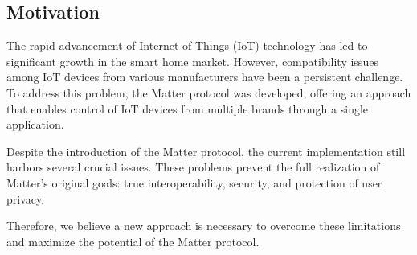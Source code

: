 \documentclass[conference]{IEEEtran}
\begin{document}
	\subsection{Motivation}
	The rapid advancement of Internet of Things (IoT) technology has led to significant
	growth in the smart home market. However, compatibility issues among IoT devices
	from various manufacturers have been a persistent challenge. To address this
	problem, the Matter protocol was developed, offering an approach that enables
	control of IoT devices from multiple brands through a single application.

	Despite the introduction of the Matter protocol, the current implementation still
	harbors several crucial issues. These problems prevent the full realization of
	Matter's original goals: true interoperability, security, and protection of user
	privacy.

	Therefore, we believe a new approach is necessary to overcome these
	limitations and maximize the potential of the Matter protocol.
\end{document}
